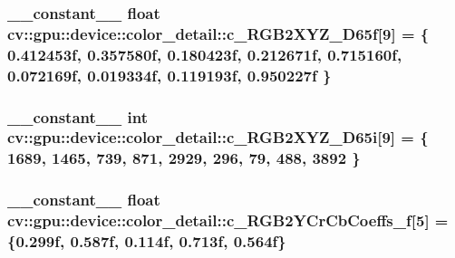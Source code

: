 \hypertarget{namespacecv_1_1gpu_1_1device_1_1color__detail_adb6f9f66aa831e69e6cd0fe39edaa77c}{
\subsubsection[{c\-\_\-\-R\-G\-B2\-X\-Y\-Z\-\_\-\-D65f}]{\setlength{\rightskip}{0pt plus 5cm}\-\_\-\-\_\-constant\-\_\-\-\_\- float cv\-::gpu\-::device\-::color\-\_\-detail\-::c\-\_\-\-R\-G\-B2\-X\-Y\-Z\-\_\-\-D65f\mbox{[}9\mbox{]} = \{ 0.\-412453f, 0.\-357580f, 0.\-180423f, 0.\-212671f, 0.\-715160f, 0.\-072169f, 0.\-019334f, 0.\-119193f, 0.\-950227f \}}}\label{namespacecv_1_1gpu_1_1device_1_1color__detail_adb6f9f66aa831e69e6cd0fe39edaa77c}
\hypertarget{namespacecv_1_1gpu_1_1device_1_1color__detail_aba86e885f91ae8aefc51ee703cd1361f}{
\subsubsection[{c\-\_\-\-R\-G\-B2\-X\-Y\-Z\-\_\-\-D65i}]{\setlength{\rightskip}{0pt plus 5cm}\-\_\-\-\_\-constant\-\_\-\-\_\- int cv\-::gpu\-::device\-::color\-\_\-detail\-::c\-\_\-\-R\-G\-B2\-X\-Y\-Z\-\_\-\-D65i\mbox{[}9\mbox{]} = \{ 1689, 1465, 739, 871, 2929, 296, 79, 488, 3892 \}}}\label{namespacecv_1_1gpu_1_1device_1_1color__detail_aba86e885f91ae8aefc51ee703cd1361f}
\hypertarget{namespacecv_1_1gpu_1_1device_1_1color__detail_adaa4dd39f9935092666b86359548bd36}{
\subsubsection[{c\-\_\-\-R\-G\-B2\-Y\-Cr\-Cb\-Coeffs\-\_\-f}]{\setlength{\rightskip}{0pt plus 5cm}\-\_\-\-\_\-constant\-\_\-\-\_\- float cv\-::gpu\-::device\-::color\-\_\-detail\-::c\-\_\-\-R\-G\-B2\-Y\-Cr\-Cb\-Coeffs\-\_\-f\mbox{[}5\mbox{]} = \{0.\-299f, 0.\-587f, 0.\-114f, 0.\-713f, 0.\-564f\}}}\label{namespacecv_1_1gpu_1_1device_1_1color__detail_adaa4dd39f9935092666b86359548bd36}
